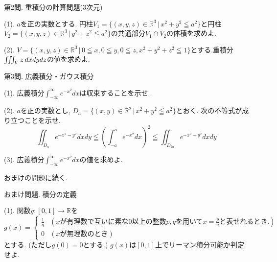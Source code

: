 \documentclass[dvipdfmx,a4paper,11pt]{article}
\newcommand{\R}{\mathbb{R}}
\theoremstyle{definition}
\begin{document}
\vspace{33pt}
{\Large 第2問.} 重積分の計算問題(3次元) 
\vspace{11pt}

{\large(1). $a$を正の実数とする. 円柱$V_1= \{ (x,y,z) \in \R^3 \,|\,x^2 + y^2 \leqq a^2\}$と円柱$V_2 = \{ (x,y,z) \in \R^3 \,|\, y^2 + z^2 \leqq a^2 \}$の共通部分$V_1 \cap V_2$の体積を求めよ.}\vspace{4pt}

{\large(2). $V=\{ (x,y,z) \in \R^3 \,|\,  0 \leqq x, 0 \leqq y, 0 \leqq z, x^2+y^2+z^2 \leqq 1\}$とする.重積分$\iiint_{V} z \text{\,}dxdydz$の値を求めよ.}



\vspace{33pt}
{\Large 第3問.} 広義積分・ガウス積分
\vspace{11pt}


{\large(1). 広義積分$\int_{- \infty}^{\infty} e^{- x^2} dx$は収束することを示せ.}\vspace{7pt}

{\large(2). $a$を正の実数とし, $D_{a} = \{  (x,y) \in \R^2 \,|\,x^2 + y^2 \leqq a^2\}$とおく. 次の不等式が成り立つことを示せ.}
$$
\iint_{D_a} e^{-x^2 - y^2} dxdy \leqq \left(\int_{-a}^{a} e^{- x^2} dx  \right)^{2} \leqq \iint_{D_{2 a}} e^{-x^2 - y^2} dxdy \
$$
\vspace{7pt}

{\large(3). 広義積分$\int_{-\infty}^{\infty} e^{- x^2} dx$の値を求めよ.}\vspace{7pt}

  \begin{flushright}
 {\LARGE おまけの問題に続く.}
 \end{flushright}
 
 \newpage
 

\vspace{44pt}
{\Large おまけ問題.} 積分の定義
\vspace{11pt}

(1). 関数$g : [0,1] \rightarrow \R$を
$$g(x)= \begin{cases} \frac{1}{q}& (\text{$x$が有理数で互いに素な0以上の整数$p,q$を用いて$x=\frac{p}{q}$と表せれるとき.})\\
0& (\text{$x$が無理数のとき})\end{cases}
$$
とする. (ただし$g(0)=0$とする.) $g(x)$は$[0,1]$上でリーマン積分可能か判定せよ. \vspace{15pt}
\end{document}
